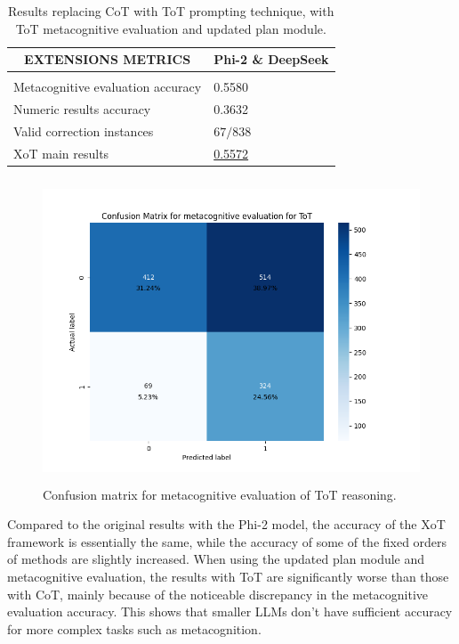 \documentclass[10pt]{article} %
\begin{document}
\begin{table}[t]
  \caption{Results replacing CoT with ToT prompting technique, with ToT metacognitive evaluation and updated plan module.}
  \label{extension2-results-with-meta}
  \begin{center}
  \begin{tabular}{ll}
  \multicolumn{1}{c}{\bf EXTENSIONS METRICS}  &\multicolumn{1}{c}{\bf Phi-2 \& DeepSeek}
  \\ \hline \\
  Metacognitive evaluation accuracy        &0.5580\\
  Numeric results accuracy                 &0.3632\\
  Valid correction instances               &$67/838$\\
  XoT main results                         &\underline{0.5572}\\
  \end{tabular}
  \end{center}
  \end{table}

  \begin{figure}[h]
    \begin{center}
      \includegraphics[height=9cm]{graphs/cm_metacognitive_tot.png}
      \end{center}
      \caption{Confusion matrix for metacognitive evaluation of ToT reasoning.}
      \label{fig:cm-metacognitive-tot}
    \end{figure}

Compared to the original results with the Phi-2 model, the accuracy of the XoT framework is essentially the same, while the accuracy of some of the fixed orders of methods are slightly increased.
When using the updated plan module and metacognitive evaluation, the results with ToT are significantly worse than those with CoT, mainly because of the noticeable discrepancy in the metacognitive evaluation accuracy. This shows that smaller LLMs don't have sufficient accuracy for more complex tasks such as metacognition. 
\end{document}
